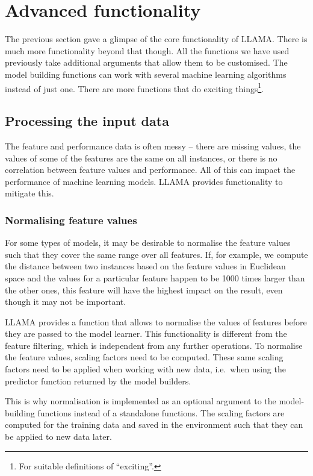 \documentclass{article}\usepackage[]{graphicx}\usepackage[]{color}
\begin{document}
\section{Advanced functionality}

The previous section gave a glimpse of the core functionality of LLAMA. There is
much more functionality beyond that though. All the functions we have used
previously take additional arguments that allow them to be customised. The model
building functions can work with several machine learning algorithms instead of
just one. There are more functions that do exciting things\footnote{For suitable
definitions of ``exciting''.}.

\subsection{Processing the input data}

The feature and performance data is often messy -- there are missing values,
the values of some of the features are the same on all instances, or there is no
correlation between feature values and performance. All of this can impact the
performance of machine learning models. LLAMA provides functionality to mitigate
this.

\subsubsection{Normalising feature values}

For some types of models, it may be desirable to normalise the feature values
such that they cover the same range over all features. If, for example, we
compute the distance between two instances based on the feature values in
Euclidean space and the values for a particular feature happen to be 1000 times
larger than the other ones, this feature will have the highest impact on the
result, even though it may not be important.

LLAMA provides a function that allows to normalise the values of features before
they are passed to the model learner. This functionality is different from the
feature filtering, which is independent from any further operations. To
normalise the feature values, scaling factors need to be computed. These same
scaling factors need to be applied when working with new data, i.e.\ when using
the predictor function returned by the model builders.

This is why normalisation is implemented as an optional argument to the
model-building functions instead of a standalone functions. The scaling factors
are computed for the training data and saved in the environment such that they
can be applied to new data later.
\end{document}
